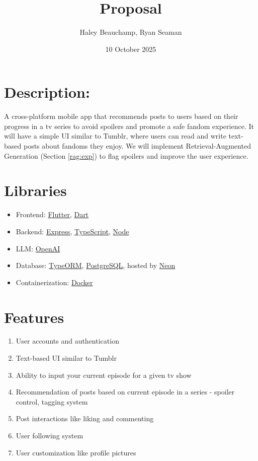 \documentclass{homework}
\author{Haley Beauchamp, Ryan Seaman}
\date{10 October 2025}
\title{Proposal}
\begin{document}
 \maketitle

\section{Description:}

A cross-platform mobile app that recommends posts to users based on
their progress in a tv series to avoid spoilers and promote a safe
fandom experience. It will have a simple UI similar to Tumblr, where
users can read and write text-based posts about fandoms they enjoy. We
will implement Retrieval-Augmented Generation (Section \ref{rag:exp})
to flag spoilers and improve the user experience.

\section{Libraries}
\begin{itemize}
  \item Frontend: 
  \href{https://flutter.dev/}{Flutter}, \href{https://dart.dev/}{Dart}
  \item Backend:    \href{https://expressjs.com/}{Express}, \href{https://www.typescriptlang.org/}{TypeScript}, 
  \href{https://nodejs.org/en}{Node}
  \item LLM: 
  \href{https://openai.com/}{OpenAI}
  \item Database: 
  \href{https://typeorm.io/}{TypeORM}, \href{https://www.postgresql.org/}{PostgreSQL}, hosted by
  \href{https://neon.com/}{Neon}
  \item Containerization: \href{https://www.docker.com/}{Docker}
\end{itemize}

\section{Features}
\begin{enumerate}
  \item User accounts and authentication
  \item Text-based UI similar to Tumblr
  \item Ability to input your current episode for a given tv show
  \item Recommendation of posts based on current episode in a series - spoiler control, tagging system
  \item Post interactions like liking and commenting
  \item User following system
  \item User customization like profile pictures
\end{enumerate}
\end{document}
